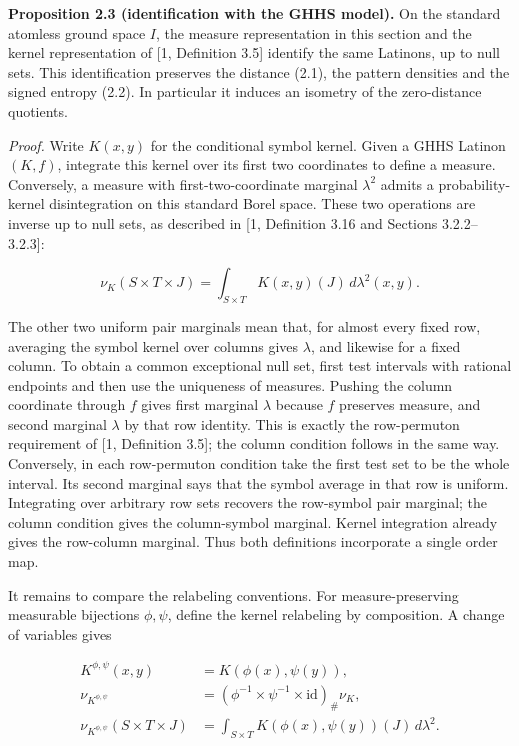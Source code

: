 \documentclass[english,11pt,a4paper]{article}
\begin{document}
\textbf{Proposition 2.3 (identification with the GHHS model).} On the standard atomless ground space \(I\), the measure representation in this section and the kernel representation of {[}1, Definition 3.5{]} identify the same Latinons, up to null sets. This identification preserves the distance (2.1), the pattern densities and the signed entropy (2.2). In particular it induces an isometry of the zero-distance quotients.

\emph{Proof.} Write \(K(x,y)\) for the conditional symbol kernel. Given a GHHS Latinon \((K,f)\), integrate this kernel over its first two coordinates to define a measure. Conversely, a measure with first-two-coordinate marginal \(\lambda^2\) admits a probability-kernel disintegration on this standard Borel space. These two operations are inverse up to null sets, as described in {[}1, Definition 3.16 and Sections 3.2.2--3.2.3{]}:

\nopagebreak[4]
\[\nu_K(S\times T\times J)=\int_{S\times T}K(x,y)(J)\,d\lambda^2(x,y).
\tag{2.9}\]

The other two uniform pair marginals mean that, for almost every fixed row, averaging the symbol kernel over columns gives \(\lambda\), and likewise for a fixed column. To obtain a common exceptional null set, first test intervals with rational endpoints and then use the uniqueness of measures. Pushing the column coordinate through \(f\) gives first marginal \(\lambda\) because \(f\) preserves measure, and second marginal \(\lambda\) by that row identity. This is exactly the row-permuton requirement of {[}1, Definition 3.5{]}; the column condition follows in the same way. Conversely, in each row-permuton condition take the first test set to be the whole interval. Its second marginal says that the symbol average in that row is uniform. Integrating over arbitrary row sets recovers the row-symbol pair marginal; the column condition gives the column-symbol marginal. Kernel integration already gives the row-column marginal. Thus both definitions incorporate a single order map.

It remains to compare the relabeling conventions. For measure-preserving measurable bijections \(\phi,\psi\), define the kernel relabeling by composition. A change of variables gives

\nopagebreak[4]
\[\begin{aligned}
K^{\phi,\psi}(x,y)&=K(\phi(x),\psi(y)),\\
\nu_{K^{\phi,\psi}}&=(\phi^{-1}\times\psi^{-1}\times\mathrm{id})_\#\nu_K,\\
\nu_{K^{\phi,\psi}}(S\times T\times J)
&=\int_{S\times T}K(\phi(x),\psi(y))(J)\,d\lambda^2.
\end{aligned}\tag{2.10}\]
\end{document}
